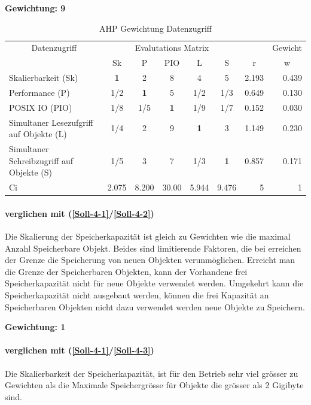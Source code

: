 \textbf{Gewichtung: 9}

\begin{table}[htbp]
\caption{AHP Gewichtung Datenzugriff}
\begin{tabular}{|p{4.5cm}|c|c|c|c|c|r|r|}
\hline
\multicolumn{ 1}{|c|}{Datenzugriff} & \multicolumn{ 5}{c|}{Evalutations Matrix} & \multicolumn{1}{l|}{} & \multicolumn{1}{l|}{Gewicht} \\ \cline{ 2- 8}
\multicolumn{ 1}{|c|}{} & Sk & P & PIO  & L & S & \multicolumn{1}{c|}{r} & \multicolumn{1}{c|}{w} \\ \hline
Skalierbarkeit (Sk) & \textbf{1} & 2 & 8 & 4 & 5 & 2.193 & 0.439 \\ \hline
Performance (P) &  1/2 & \textbf{1} & 5 &  1/2 &  1/3 & 0.649 & 0.130 \\ \hline
POSIX IO (PIO) &  1/8 &  1/5 & \textbf{1} &  1/9 &  1/7 & 0.152 & 0.030 \\ \hline
Simultaner Lesezufgriff 
auf Objekte (L) &  1/4 & 2 & 9 & \textbf{1} & 3 & 1.149 & 0.230 \\ \hline
Simultaner Schreibzugriff
 auf Objekte (S) &  1/5 & 3 & 7 &  1/3 & \textbf{1} & 0.857 & 0.171 \\ \hline \hline
Ci & \multicolumn{1}{r|}{2.075} & \multicolumn{1}{r|}{8.200} & \multicolumn{1}{r|}{30.00} & \multicolumn{1}{r|}{5.944} & \multicolumn{1}{r|}{9.476} & 5 & 1 \\ \hline
\end{tabular}
\label{AHPDatenzugriff}
\end{table}

\paragraph*{ verglichen mit  (\ref{Soll-4-1}/\ref{Soll-4-2})}
Die Skalierung der Speicherkapazität ist gleich zu Gewichten wie die maximal Anzahl Speicherbare Objekt. Beides sind limitierende Faktoren, die bei erreichen der Grenze die Speicherung von neuen Objekten verunmöglichen. Erreicht man die Grenze der Speicherbaren Objekten,  kann der Vorhandene frei Speicherkapazität nicht für neue Objekte verwendet werden. Umgekehrt kann die Speicherkapazität nicht ausgebaut werden, können die frei Kapazität an Speicherbaren Objekten nicht dazu verwendet werden neue Objekte zu Speichern.

\textbf{Gewichtung: 1}

\paragraph*{ verglichen mit  (\ref{Soll-4-1}/\ref{Soll-4-3})}
Die Skalierbarkeit der Speicherkapazität, ist für den Betrieb sehr viel grösser zu Gewichten als die Maximale Speichergrösse für Objekte die grösser als 2 Gigibyte sind.

